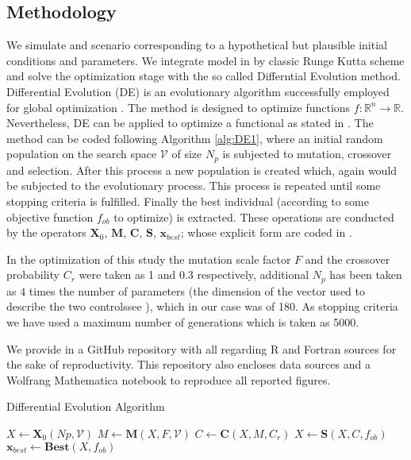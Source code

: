 \subsection{Methodology}
    We simulate and scenario corresponding to a hypothetical but plausible
initial conditions and parameters. We integrate model in
 by classic Runge Kutta scheme and solve the
optimization stage with the so called Differntial Evolution method.
Differential Evolution (DE) \cite{Storn1997} is an evolutionary
algorithm successfully employed for global optimization
\cite{Bilal2020}. The method is designed to optimize functions
$f:\mathbb{R}^n \to \mathbb{R}$. Nevertheless, DE can be applied to
optimize a functional as stated in \cite{CANTUNetAl}. The method can be
coded following Algorithm \ref{alg:DE1}, where an initial random
population on the search space $\mathcal{V}$ of size $N_p$ is subjected
to mutation, crossover and selection. After this process a new
population is created which, again would be subjected to the
evolutionary process. This process is repeated until some stopping
criteria is fulfilled. Finally the best individual (according to some
objective function $f_{ob}$ to optimize) is extracted. These operations
are conducted by the operators $\mathbf{X}_0$, $\mathbf{M}$,
$\mathbf{C}$, $\mathbf{S}$, $\mathbf{x}_{best}$;  whose explicit form
are coded in \cite{Penunuri2016}.

In the optimization of this study
the mutation scale factor $F$ and the crossover probability $C_r$ were
taken as 1 and 0.3 respectively, additional $N_p$ has been taken as 4
times the number of parameters (the dimension of the vector used to
describe the two controls\textemdash see \cite{CANTUNetAl}), which in our case was
of 180. As stopping criteria we have used a maximum number of
generations which is taken as \num{5000}.

    We provide in \cite{gitHub_b} a GitHub repository with all regarding R
and Fortran sources for the sake of reproductivity. This repository also
encloses data sources and a Wolfrang Mathematica notebook to reproduce all
reported figures.
%
%
\begin{algorithm}[htb]
  \caption{Differential Evolution Algorithm}
  \label{alg:DE1}
  \begin{algorithmic}
    \State $X \leftarrow \mathbf{X}_0(Np,\mathcal{V})$
    \State $M \leftarrow \mathbf{M}(X,F,\mathcal{V})$
    \State $C \leftarrow \mathbf{C}(X,M,C_r)$
    \State $X \leftarrow \mathbf{S}(X,C,f_{ob})$
    \EndWhile
    \State $\mathbf{x}_{best} \leftarrow \mathbf{Best}(X, f_{ob})$
  \end{algorithmic}
\end{algorithm}
